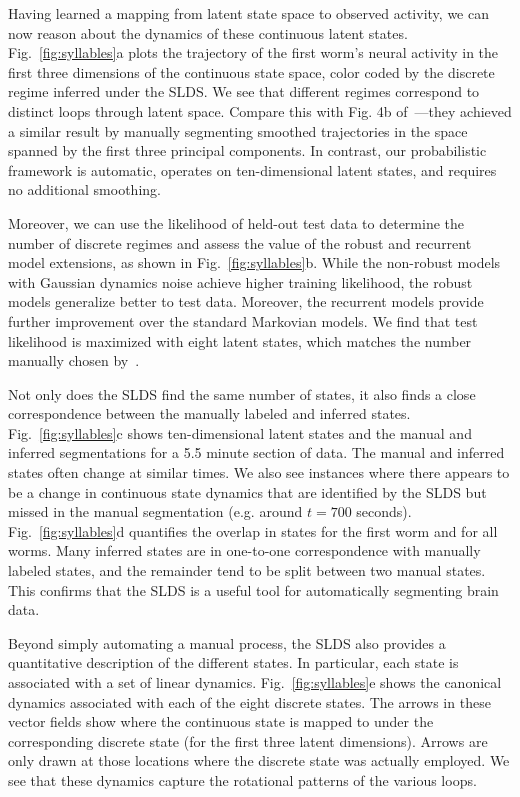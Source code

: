 \documentclass[11pt]{article}
\begin{document}
Having learned a mapping from latent state space to observed activity,
we can now reason about the dynamics of these continuous latent
states. Fig.~\ref{fig:syllables}a plots the trajectory of the first
worm's neural activity in the first three dimensions of the continuous
state space, color coded by the discrete regime inferred under the
SLDS.  We see that different regimes correspond to distinct loops
through latent space.  Compare this with Fig. 4b
of~\citet{kato2015global}---they achieved a similar result by manually
segmenting smoothed trajectories in the space spanned by the first
three principal components.  In contrast, our probabilistic framework
is automatic, operates on ten-dimensional latent states, and requires
no additional smoothing.

Moreover, we can use the likelihood of held-out test data to determine
the number of discrete regimes and assess the value of the robust and
recurrent model extensions, as shown in Fig.~\ref{fig:syllables}b.
While the non-robust models with Gaussian dynamics noise achieve
higher training likelihood, the robust models generalize better to
test data.  Moreover, the recurrent models provide further improvement
over the standard Markovian models.  We find that test likelihood is
maximized with eight latent states, which matches the number manually
chosen by~\citet{kato2015global}.

Not only does the SLDS find the same number of states, it also finds a
close correspondence between the manually labeled and inferred states.
Fig.~\ref{fig:syllables}c shows ten-dimensional latent states and the
manual and inferred segmentations for a 5.5 minute section of data.
The manual and inferred states often change at similar times. We also
see instances where there appears to be a change in continuous state
dynamics that are identified by the SLDS but missed in the manual
segmentation (e.g. around $t=700$ seconds).  Fig.~\ref{fig:syllables}d
quantifies the overlap in states for the first worm and for all worms.
Many inferred states are in one-to-one correspondence with manually
labeled states, and the remainder tend to be split between two manual
states.  This confirms that the SLDS is a useful tool for automatically
segmenting brain data.

Beyond simply automating a manual process, the SLDS also provides a
quantitative description of the different states.  In particular, each
state is associated with a set of linear dynamics.
Fig.~\ref{fig:syllables}e shows the canonical dynamics associated with
each of the eight discrete states. The arrows in these vector fields
show where the continuous state is mapped to under the corresponding
discrete state (for the first three latent dimensions).  Arrows are
only drawn at those locations where the discrete state was actually
employed.  We see that these dynamics capture the rotational patterns
of the various loops.
\end{document}
